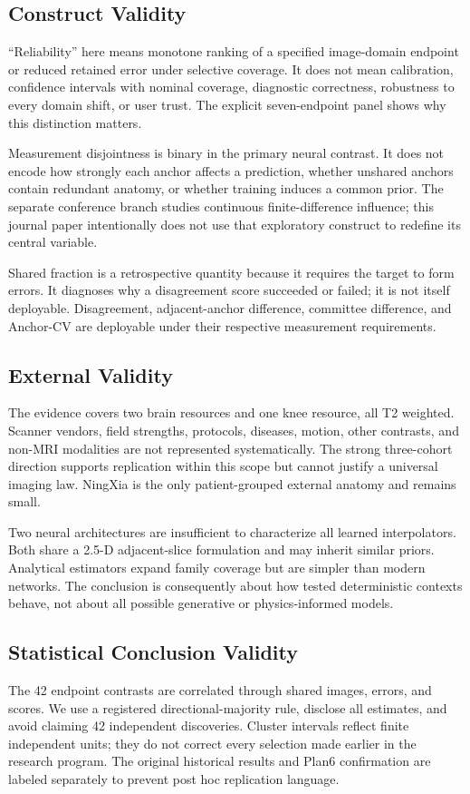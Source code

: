 \documentclass[journal,10pt]{IEEEtran}
\begin{document}
\subsection{Construct Validity}
``Reliability'' here means monotone ranking of a specified image-domain endpoint or reduced retained error under selective coverage. It does not mean calibration, confidence intervals with nominal coverage, diagnostic correctness, robustness to every domain shift, or user trust. The explicit seven-endpoint panel shows why this distinction matters.

Measurement disjointness is binary in the primary neural contrast. It does not encode how strongly each anchor affects a prediction, whether unshared anchors contain redundant anatomy, or whether training induces a common prior. The separate conference branch studies continuous finite-difference influence; this journal paper intentionally does not use that exploratory construct to redefine its central variable.

Shared fraction is a retrospective quantity because it requires the target to form errors. It diagnoses why a disagreement score succeeded or failed; it is not itself deployable. Disagreement, adjacent-anchor difference, committee difference, and Anchor-CV are deployable under their respective measurement requirements.

\subsection{External Validity}
The evidence covers two brain resources and one knee resource, all T2 weighted. Scanner vendors, field strengths, protocols, diseases, motion, other contrasts, and non-MRI modalities are not represented systematically. The strong three-cohort direction supports replication within this scope but cannot justify a universal imaging law. NingXia is the only patient-grouped external anatomy and remains small.

Two neural architectures are insufficient to characterize all learned interpolators. Both share a 2.5-D adjacent-slice formulation and may inherit similar priors. Analytical estimators expand family coverage but are simpler than modern networks. The conclusion is consequently about how tested deterministic contexts behave, not about all possible generative or physics-informed models.

\subsection{Statistical Conclusion Validity}
The 42 endpoint contrasts are correlated through shared images, errors, and scores. We use a registered directional-majority rule, disclose all estimates, and avoid claiming 42 independent discoveries. Cluster intervals reflect finite independent units; they do not correct every selection made earlier in the research program. The original historical results and Plan6 confirmation are labeled separately to prevent post hoc replication language.
\end{document}

